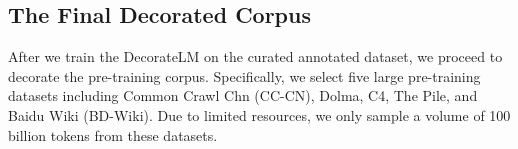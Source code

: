 \documentclass[11pt]{article}
\begin{document}

\subsection{The Final Decorated Corpus}
After we train the DecorateLM on the curated annotated dataset, we proceed to decorate the pre-training corpus. 
Specifically, we select five large pre-training datasets including Common Crawl Chn (CC-CN), Dolma, C4, The Pile, and Baidu Wiki (BD-Wiki). 
Due to limited resources, we only sample a volume of 100 billion tokens from these datasets.
\end{document}
